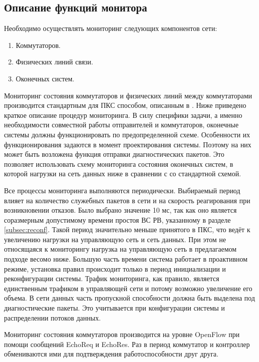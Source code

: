 \documentclass[12pt, a4paper]{article}
\begin{document}
\subsection{Описание функций монитора} \label{subsec:monitor}

Необходимо осуществлять мониторинг следующих компонентов сети:
\begin{enumerate}
	\item Коммутаторов.
	\item Физических линий связи.
	\item Оконечных систем.
\end{enumerate}

Мониторинг состояния коммутаторов и физических линий между коммутаторами производится стандартным для ПКС способом, описанным в \cite{monitor1, monitor2}. Ниже приведено краткое описание процедур мониторинга. В силу специфики задачи, а именно необходимости совместной работы отправителей и коммутаторов, оконечные системы должны функционировать по предопределенной схеме. Особенности их функционирования задаются в момент проектирования системы. Поэтому на них может быть возложена функция отправки диагностических пакетов. Это позволяет использовать схему мониторинга состояния оконечных систем, в которой нагрузки на сеть данных ниже в сравнении с со стандартной схемой.

Все процессы мониторинга выполняются периодически. Выбираемый период влияет на количество служебных пакетов в сети и на скорость реагирования при возникновении отказов. Было выбрано значение 10 мс, так как оно является соразмерным допустимому времени простоя ВС РВ, указанному в разделе \ref{subsec:reconf}. Такой период значительно меньше принятого в ПКС, что ведёт к увеличению нагрузки на управляющую сеть и сеть данных. При этом не относящаяся к мониторингу нагрузка на управляющую сеть в предлагаемом подходе весомо ниже. Большую часть времени система работает в проактивном режиме, установка правил происходит только в период инициализации и реконфигурации системы. Трафик мониторинга, как правило, является единственным трафиком в управляющей сети и потому возможно увеличение его объема. В сети данных часть пропускной способности должна быть выделена под диагностические пакеты. Это учитывается при конфигурации системы и распределении потоков данных.

Мониторинг состояния коммутаторов производится на уровне OpenFlow при помощи сообщений EchoReq и EchoRes. Раз в период коммутатор и контроллер обмениваются ими для подтверждения работоспособности друг друга.
\end{document}
